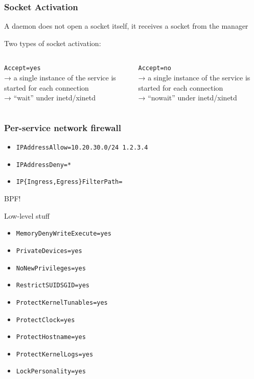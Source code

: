 \documentclass[serif]{beamer}
\begin{document}
\begin{frame}[c]
  \frametitle{Socket Activation}

  A daemon does not open a socket itself, it receives a socket from the manager

  \medskip
  \pause

  \centering
  Two types of socket activation:

  \medskip

  \begin{columns}
    \begin{column}{0.5\textwidth}
      \texttt{Accept=yes}\\
      → a single instance of the service is started for each connection\\
      → ``wait'' under inetd/xinetd
    \end{column}
    \begin{column}{0.5\textwidth}
      \texttt{Accept=no}\\
      → a single instance of the service is started for each connection\\
      → ``nowait'' under inetd/xinetd
    \end{column}
  \end{columns}
\end{frame}

\begin{frame}
  \frametitle{Per-service network firewall}

  \begin{itemize}
  \item \texttt{IPAddressAllow=\color{gray}10.20.30.0/24 1.2.3.4}
  \item \texttt{IPAddressDeny=\color{gray}*}
  \item \texttt{IP\{Ingress,Egress\}FilterPath=}
  \end{itemize}

  BPF!
\end{frame}

\begin{frame}[c]
  \Huge{Low-level stuff}
\end{frame}

\begin{frame}
  \begin{itemize}
  \item \texttt{MemoryDenyWriteExecute=yes}
  \item \texttt{PrivateDevices=yes}
  \item \texttt{NoNewPrivileges=yes}
  \item \texttt{RestrictSUIDSGID=yes}
  \item \texttt{ProtectKernelTunables=yes}
  \item \texttt{ProtectClock=yes}
  \item \texttt{ProtectHostname=yes}
  \item \texttt{ProtectKernelLogs=yes}
  \item \texttt{LockPersonality=yes}
  \end{itemize}
\end{frame}
\end{document}
